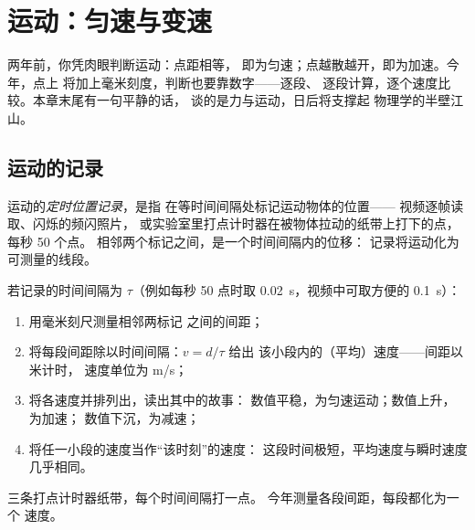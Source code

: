 \chapter{运动：匀速与变速}\label{ch:g9:uniform-varied-motion}

两年前，你凭肉眼判断运动：点距相等，
即为匀速；点越散越开，即为加速。今年，点上
将加上毫米刻度，判断也要靠数字——逐段、
逐段计算，逐个速度比较。本章末尾有一句平静的话，
谈的是力与运动，日后将支撑起
物理学的半壁江山。

\section{运动的记录}

\begin{definition}[定时位置记录]\label{def:g9:uniform-varied-motion:record}
运动的\emph{定时位置记录}，是指
在等时间间隔处标记运动物体的位置——
视频逐帧读取、闪烁的频闪照片，
或实验室里打点计时器在被物体拉动的纸带上打下的点，
每秒 50 个点。
相邻两个标记之间，是一个时间间隔内的位移：
记录将运动化为可测量的线段。
\end{definition}

\begin{method}[用数字读取记录]\label{met:g9:uniform-varied-motion:read}
若记录的时间间隔为 $\tau$（例如每秒 50 点时取
\qty{0.02}{s}，视频中可取方便的 \qty{0.1}{s}）：
\begin{enumerate}
  \item 用毫米刻尺测量相邻两标记
        之间的间距；
  \item 将每段间距除以时间间隔：$v = d/\tau$ 给出
        该小段内的（平均）速度——间距以米计时，
        速度单位为 \unit{m/s}；
  \item 将各速度并排列出，读出其中的故事：
        数值平稳，为匀速运动；数值上升，为加速；
        数值下沉，为减速；
  \item 将任一小段的速度当作“该时刻”的速度：
        这段时间极短，平均速度与瞬时速度
        几乎相同。
\end{enumerate}
\end{method}

\begin{omfigure}

{\small 三条打点计时器纸带，每个时间间隔打一点。
今年测量各段间距，每段都化为一个
速度。}
\end{omfigure}

